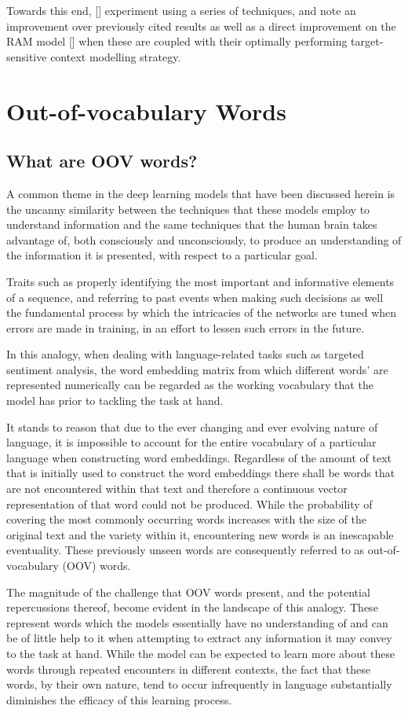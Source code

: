 \documentclass[12pt, a4paper]{report}
\theoremstyle{definition}
\theoremstyle{definition}%
\theoremstyle{definition}%
\theoremstyle{definition}%
\theoremstyle{definition}%
\theoremstyle{definition}%
\renewcommand{\cite}[1]{[\citealp{#1}]}
\begin{document}
Towards this end, \cite{wang2018} experiment using a series of techniques, and note an improvement over previously cited results as well as a direct improvement on the RAM model \cite{chen2017} when these are coupled with their optimally performing target-sensitive context modelling strategy.

\section{Out-of-vocabulary Words}
\subsection{What are OOV words?}
A common theme in the deep learning models that have been discussed herein is the uncanny similarity between the techniques that these models employ to understand information and the same techniques that the human brain takes advantage of, both consciously and unconsciously, to produce an understanding of the information it is presented, with respect to a particular goal.

Traits such as properly identifying the most important and informative elements of a sequence, and referring to past events when making such decisions as well the fundamental process by which the intricacies of the networks are tuned when errors are made in training, in an effort to lessen such errors in the future.

In this analogy, when dealing with language-related tasks such as targeted sentiment analysis, the word embedding matrix from which different words' are represented numerically can be regarded as the working vocabulary that the model has prior to tackling the task at hand.

It stands to reason that due to the ever changing and ever evolving nature of language, it is impossible to account for the entire vocabulary of a particular language when constructing word embeddings. Regardless of the amount of text that is initially used to construct the word embeddings there shall be words that are not encountered within that text and therefore a continuous vector representation of that word could not be produced. While the probability of covering the most commonly occurring words increases with the size of the original text and the variety within it, encountering new words is an inescapable eventuality. These previously unseen words are consequently referred to as out-of-vocabulary (OOV) words.

The magnitude of the challenge that OOV words present, and the potential repercussions thereof, become evident in the landscape of this analogy. These represent words which the models essentially have no understanding of and can be of little help to it when attempting to extract any information it may convey to the task at hand. While the model can be expected to learn more about these words through repeated encounters in different contexts, the fact that these words, by their own nature, tend to occur infrequently in language substantially diminishes the efficacy of this learning process.
\end{document}
